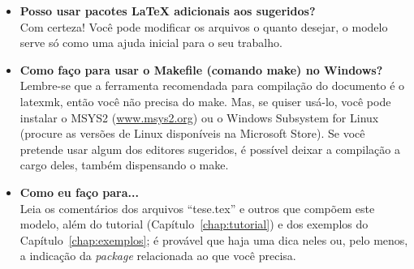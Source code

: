 \begin{itemize}
\item \textbf{Posso usar pacotes \LaTeX{} adicionais aos sugeridos?}\\
Com certeza! Você pode modificar os arquivos o quanto desejar, o modelo serve só como uma ajuda inicial para o seu trabalho.

\item \textbf{Como faço para usar o Makefile (comando make) no Windows?}\\
Lembre-se que a ferramenta recomendada para compilação do documento é o \textsf{latexmk}, então você não precisa do \textsf{make}. Mas, se quiser usá-lo, você pode instalar o MSYS2 (\url{www.msys2.org}) ou o Windows Subsystem for Linux (procure as versões de Linux disponíveis na Microsoft Store). Se você pretende usar algum dos editores sugeridos, é possível deixar a compilação a cargo deles, também dispensando o \textsf{make}.

\item \textbf{Como eu faço para...}\\
Leia os comentários dos arquivos ``tese.tex'' e outros que compõem este modelo, além do tutorial (Capítulo~\ref{chap:tutorial}) e dos exemplos do Capítulo~\ref{chap:exemplos}; é provável que haja uma dica neles ou, pelo menos, a indicação da \textit{package} relacionada ao que você precisa.

\end{itemize}

